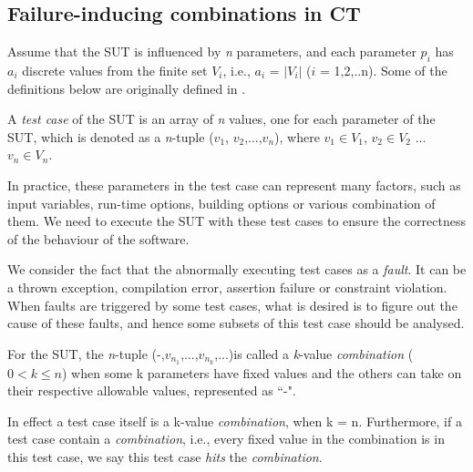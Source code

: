 \documentclass{sig-alternate}
\begin{document}
\subsection{Failure-inducing combinations in CT}

Assume that the SUT is influenced by \emph{n} parameters, and each parameter $p_{i}$ has $a_{i}$ discrete values from the finite set $V_{i}$, i.e., $a_{i}$ = $|V_{i}|$ ($i$ = 1,2,..n). Some of the definitions below are originally defined in \cite{nie2011survey}.

\begin{definition}
A \emph{test case} of the SUT is an array of \emph{n} values, one for each parameter of the SUT, which is denoted as a \emph{n}-tuple ($v_{1}$, $v_{2}$,...,$v_{n}$), where $v_{1}\in V_{1}$, $v_{2} \in V_{2}$ ... $v_{n} \in V_{n}$.
\end{definition}

In practice, these parameters in the test case can represent many factors, such as input variables, run-time options, building options or various combination of them. We need to execute the SUT with these test cases to ensure the correctness of the behaviour of the software.

We consider the fact that the abnormally executing test cases as a \emph{fault}. It can be a thrown exception, compilation error, assertion failure or constraint violation. When faults are triggered by some test cases, what is desired is to figure out the cause of these faults, and hence some subsets of this test case should be analysed.



\begin{definition}
For the SUT, the \emph{n}-tuple (-,$v_{n_{1}}$,...,$v_{n_{k}}$,...)is called a \emph{k}-value \emph{combination} ($0 < k \leq n $) when some k parameters have fixed values and the others can take on their respective allowable values, represented as ``-".

In effect a test case itself is a k-value \emph{combination}, when k = n. Furthermore, if a test case contain a \emph{combination}, i.e., every fixed value in the combination is in this test case, we say this test case \emph{hits} the \emph{combination}.
\end{definition}
\end{document}
